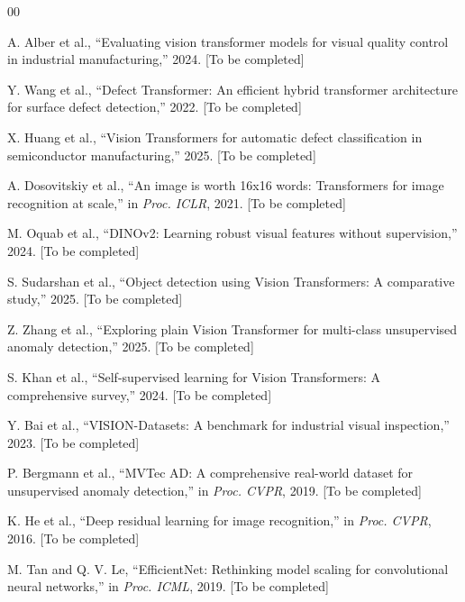 \documentclass[journal,twoside,web]{ieeecolor}
\begin{document}
\begin{thebibliography}{00}

A. Alber et al., ``Evaluating vision transformer models for visual quality control in industrial manufacturing,'' 2024. [To be completed]

Y. Wang et al., ``Defect Transformer: An efficient hybrid transformer architecture for surface defect detection,'' 2022. [To be completed]

X. Huang et al., ``Vision Transformers for automatic defect classification in semiconductor manufacturing,'' 2025. [To be completed]

A. Dosovitskiy et al., ``An image is worth 16x16 words: Transformers for image recognition at scale,'' in \emph{Proc. ICLR}, 2021. [To be completed]

M. Oquab et al., ``DINOv2: Learning robust visual features without supervision,'' 2024. [To be completed]

S. Sudarshan et al., ``Object detection using Vision Transformers: A comparative study,'' 2025. [To be completed]

Z. Zhang et al., ``Exploring plain Vision Transformer for multi-class unsupervised anomaly detection,'' 2025. [To be completed]

S. Khan et al., ``Self-supervised learning for Vision Transformers: A comprehensive survey,'' 2024. [To be completed]

Y. Bai et al., ``VISION-Datasets: A benchmark for industrial visual inspection,'' 2023. [To be completed]

P. Bergmann et al., ``MVTec AD: A comprehensive real-world dataset for unsupervised anomaly detection,'' in \emph{Proc. CVPR}, 2019. [To be completed]

K. He et al., ``Deep residual learning for image recognition,'' in \emph{Proc. CVPR}, 2016. [To be completed]

M. Tan and Q. V. Le, ``EfficientNet: Rethinking model scaling for convolutional neural networks,'' in \emph{Proc. ICML}, 2019. [To be completed]


\end{thebibliography}
\end{document}
